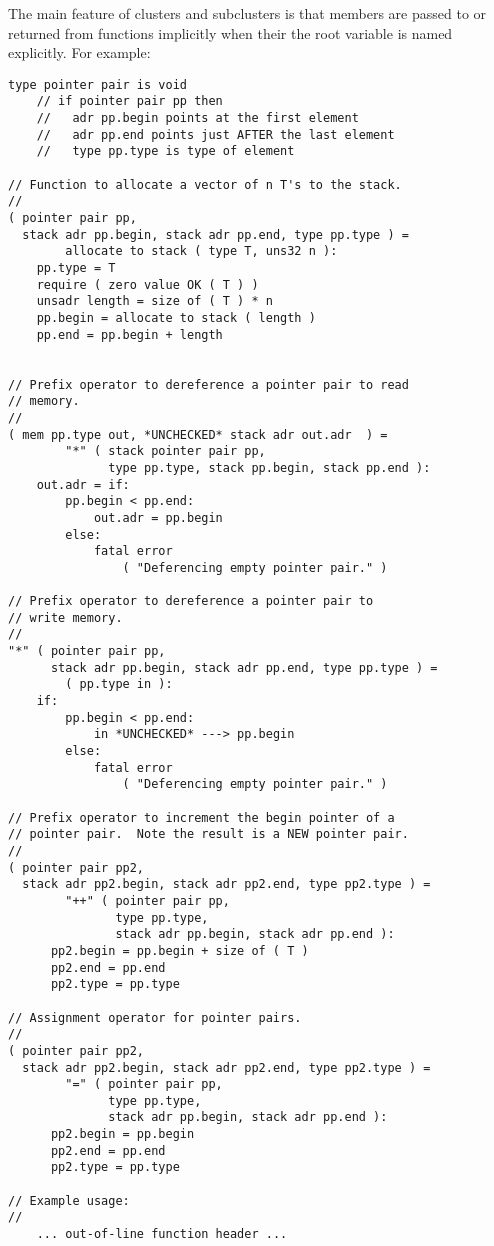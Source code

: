 \documentclass[12pt]{article}
\newenvironment{indpar}[1][0.3in]%
	{\begin{list}{}%
		     {\setlength{\itemsep}{0in}%
		      \setlength{\topsep}{0in}%
		      \setlength{\parsep}{1ex}%
		      \setlength{\labelwidth}{#1}%
		      \setlength{\leftmargin}{#1}%
		      \addtolength{\leftmargin}{\labelsep}}%
	 \item}%
	{\end{list}}
\begin{document}
The main feature of clusters and subclusters
is that members are passed to or returned
from functions implicitly when their the root variable is named
explicitly.  For example:
\begin{indpar}\begin{verbatim}
type pointer pair is void
    // if pointer pair pp then
    //   adr pp.begin points at the first element
    //   adr pp.end points just AFTER the last element
    //   type pp.type is type of element

// Function to allocate a vector of n T's to the stack.
//
( pointer pair pp,
  stack adr pp.begin, stack adr pp.end, type pp.type ) =
        allocate to stack ( type T, uns32 n ):
    pp.type = T
    require ( zero value OK ( T ) )
    unsadr length = size of ( T ) * n
    pp.begin = allocate to stack ( length )
    pp.end = pp.begin + length


// Prefix operator to dereference a pointer pair to read
// memory.
//
( mem pp.type out, *UNCHECKED* stack adr out.adr  ) =
        "*" ( stack pointer pair pp,
              type pp.type, stack pp.begin, stack pp.end ):
    out.adr = if:
        pp.begin < pp.end:
            out.adr = pp.begin
        else:
            fatal error
                ( "Deferencing empty pointer pair." )

// Prefix operator to dereference a pointer pair to
// write memory.
//
"*" ( pointer pair pp,
      stack adr pp.begin, stack adr pp.end, type pp.type ) =
        ( pp.type in ):
    if:
        pp.begin < pp.end:
            in *UNCHECKED* ---> pp.begin
        else:
            fatal error
                ( "Deferencing empty pointer pair." )

// Prefix operator to increment the begin pointer of a
// pointer pair.  Note the result is a NEW pointer pair.
//
( pointer pair pp2,
  stack adr pp2.begin, stack adr pp2.end, type pp2.type ) =
        "++" ( pointer pair pp,
               type pp.type,
               stack adr pp.begin, stack adr pp.end ):
      pp2.begin = pp.begin + size of ( T )
      pp2.end = pp.end
      pp2.type = pp.type

// Assignment operator for pointer pairs.
//
( pointer pair pp2,
  stack adr pp2.begin, stack adr pp2.end, type pp2.type ) =
        "=" ( pointer pair pp,
              type pp.type,
              stack adr pp.begin, stack adr pp.end ):
      pp2.begin = pp.begin
      pp2.end = pp.end
      pp2.type = pp.type

// Example usage:
//
    ... out-of-line function header ...


\end{verbatim}
\end{indpar}
\end{document}
